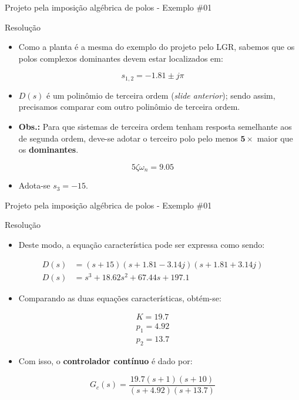 \begin{frame}{Projeto pela imposição algébrica de polos - Exemplo \#01}
	\begin{block}{Resolução}
\begin{itemize}
    \item Como a planta é a mesma do exemplo do projeto pelo LGR, sabemos que os polos complexos dominantes devem estar localizados em:
\end{itemize}	
$$s_{1,2}=-\num{1,81}\pm j\pi$$
\begin{itemize}
    \item $D(s)$ é um polinômio de terceira ordem (\textit{slide anterior}); sendo assim, precisamos comparar com outro polinômio de terceira ordem.
    \item \textbf{Obs.:} Para que sistemas de terceira ordem tenham resposta semelhante aos de segunda ordem, deve-se adotar o terceiro polo pelo menos $ \bm{5\times} $ maior que os \textbf{dominantes}.
\end{itemize}	
$$5\zeta\omega_n=\num{9,05}$$
\begin{itemize}
    \item Adota-se $ s_3=-15 $.
\end{itemize}

\end{block}
\end{frame}

\begin{frame}{Projeto pela imposição algébrica de polos - Exemplo \#01}
	\begin{block}{Resolução}
\begin{itemize}
    \item Deste modo, a equação característica pode ser expressa como sendo:
\end{itemize}
		\begin{align*}
			D(s)&=(s+15)(s+\num{1,81}-\num{3,14}j)(s+\num{1,81}+\num{3,14}j)\\
			D(s)&=s^{3}+\num{18,62}s^{2}+\num{67,44}s+\num{197,1}
		\end{align*}
		\vspace{-0.3cm}
\begin{itemize}
    \item Comparando as duas equações características, obtém-se:
\end{itemize}		
		\begin{gather*}
			K=\num{19,7}\\
			p_1=\num{4,92}\\
			p_2=\num{13,7}
		\end{gather*}
		\vspace{-0.3cm}
\begin{itemize}
    \item Com isso, o \textbf{controlador contínuo} é dado por:
\end{itemize}
		\[ G_c(s)=\dfrac{\num{19,7}(s+1)(s+10)}{(s+\num{4,92})(s+\num{13,7})} \]
\end{block}
\end{frame}

